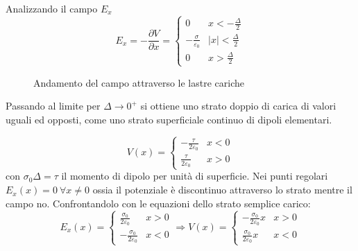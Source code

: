 Analizzando il campo $E_x$
$$
E_x = -\frac{\partial V}{\partial x} = \begin{cases}
0 & x < -\frac{\Delta}{2} \\
-\frac{\sigma}{\varepsilon_0} & |x| < \frac{\Delta}{2} \\
0 & x > \frac{\Delta}{2}
\end{cases}
$$

\begin{figure}[h] %
\centering
{}
\caption{Andamento del campo attraverso le lastre cariche}
\label{fig:campo_lastre_cariche}
\end{figure}

Passando al limite per $\Delta \to 0^+$ si ottiene uno strato doppio di carica di valori
uguali ed opposti, come uno strato superficiale continuo di dipoli elementari.

$$
V(x) = \begin{cases}
-\frac{\tau}{2\varepsilon_0} & x<0 \\
\frac{\tau}{2\varepsilon_0} & x>0
\end{cases}
$$
con $\sigma_0\Delta = \tau$ il momento di dipolo per unità di superficie.
Nei punti regolari $E_x(x) = 0\ \forall x \neq 0 $ ossia il potenziale è discontinuo
attraverso lo strato mentre il campo no.
Confrontandolo con le equazioni dello strato semplice carico:
$$
E_x(x) = \begin{cases}
\frac{\sigma_0}{2\varepsilon_0} & x > 0\\
- \frac{\sigma_0}{2 \varepsilon_0} & x < 0
\end{cases} \Rightarrow V(x) = \begin{cases}
-\frac{\sigma_0}{2\varepsilon_0}x & x > 0 \\
\frac{\sigma_0}{2\varepsilon_0}x & x<0
\end{cases}
$$

